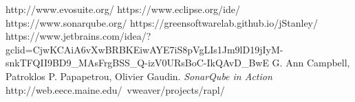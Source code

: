 \documentclass[runningheads]{llncs}
\begin{document}
 








\newpage

\begin{thebibliography}{8}

 {http://www.evosuite.org/}
 {https://www.eclipse.org/ide/}
 {https://www.sonarqube.org/}
 {https://greensoftwarelab.github.io/jStanley/}
 {https://www.jetbrains.com/idea/?gclid=CjwKCAiA6vXwBRBKEiwAYE7iS8pVgLIs1Jm9lD19jIyM-snkTFQII9BD9\_MAsFrgBSS\_Q-izV0URsBoC-IkQAvD\_BwE}
G. Ann Campbell, Patroklos P. Papapetrou, Olivier Gaudin.\textit{  SonarQube in Action}
 {http://web.eece.maine.edu/~vweaver/projects/rapl/}

\end{thebibliography}
\end{document}
